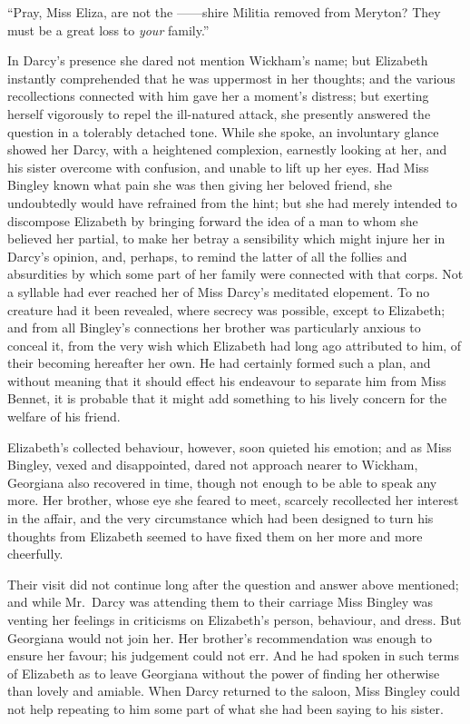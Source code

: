 \documentclass[12pt,english]{book}
\begin{document}
{}``Pray, Miss Eliza, are not the \mbox{------}shire Militia removed
from Meryton? They must be a great loss to \textit{your} family.''

In Darcy's presence she dared not mention Wickham's name; but Elizabeth
instantly comprehended that he was uppermost in her thoughts; and
the various recollections connected with him gave her a moment's distress;
but exerting herself vigorously to repel the ill-natured attack, she
presently answered the question in a tolerably detached tone. While
she spoke, an involuntary glance showed her Darcy, with a heightened
complexion, earnestly looking at her, and his sister overcome with
confusion, and unable to lift up her eyes. Had Miss Bingley known
what pain she was then giving her beloved friend, she undoubtedly
would have refrained from the hint; but she had merely intended to
discompose Elizabeth by bringing forward the idea of a man to whom
she believed her partial, to make her betray a sensibility which might
injure her in Darcy's opinion, and, perhaps, to remind the latter
of all the follies and absurdities by which some part of her family
were connected with that corps. Not a syllable had ever reached her
of Miss Darcy's meditated elopement. To no creature had it been revealed,
where secrecy was possible, except to Elizabeth; and from all Bingley's
connections her brother was particularly anxious to conceal it, from
the very wish which Elizabeth had long ago attributed to him, of their
becoming hereafter her own. He had certainly formed such a plan, and
without meaning that it should effect his endeavour to separate him
from Miss Bennet, it is probable that it might add something to his
lively concern for the welfare of his friend.

Elizabeth's collected behaviour, however, soon quieted his emotion;
and as Miss Bingley, vexed and disappointed, dared not approach nearer
to Wickham, Georgiana also recovered in time, though not enough to
be able to speak any more. Her brother, whose eye she feared to meet,
scarcely recollected her interest in the affair, and the very circumstance
which had been designed to turn his thoughts from Elizabeth seemed
to have fixed them on her more and more cheerfully.

Their visit did not continue long after the question and answer above
mentioned; and while Mr.\ Darcy was attending them to their carriage
Miss Bingley was venting her feelings in criticisms on Elizabeth's
person, behaviour, and dress. But Georgiana would not join her. Her
brother's recommendation was enough to ensure her favour; his judgement
could not err. And he had spoken in such terms of Elizabeth as to
leave Georgiana without the power of finding her otherwise than lovely
and amiable. When Darcy returned to the saloon, Miss Bingley could
not help repeating to him some part of what she had been saying to
his sister.
\end{document}
